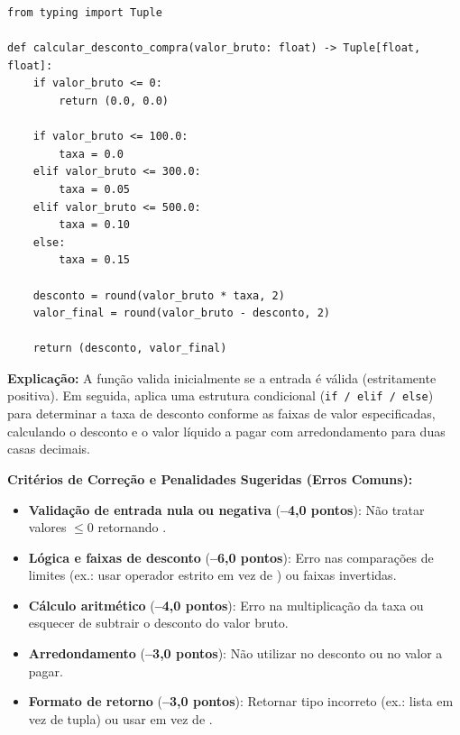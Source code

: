 \ifmostrarGabarito
\begin{verbatim}
from typing import Tuple

def calcular_desconto_compra(valor_bruto: float) -> Tuple[float, float]:
    if valor_bruto <= 0:
        return (0.0, 0.0)
    
    if valor_bruto <= 100.0:
        taxa = 0.0
    elif valor_bruto <= 300.0:
        taxa = 0.05
    elif valor_bruto <= 500.0:
        taxa = 0.10
    else:
        taxa = 0.15
        
    desconto = round(valor_bruto * taxa, 2)
    valor_final = round(valor_bruto - desconto, 2)
    
    return (desconto, valor_final)
\end{verbatim}

\textbf{Explicação:}
A função valida inicialmente se a entrada é válida (estritamente positiva). Em seguida, aplica uma estrutura condicional (\texttt{if / elif / else}) para determinar a taxa de desconto conforme as faixas de valor especificadas, calculando o desconto e o valor líquido a pagar com arredondamento para duas casas decimais.

\vspace{0.3cm}
\textbf{Critérios de Correção e Penalidades Sugeridas (Erros Comuns):}
\begin{itemize}[leftmargin=*, noitemsep, topsep=2pt]
    \item \textbf{Validação de entrada nula ou negativa} (\textbf{--4,0 pontos}): Não tratar valores $\le 0$ retornando .
    \item \textbf{Lógica e faixas de desconto} (\textbf{--6,0 pontos}): Erro nas comparações de limites (ex.: usar operador estrito \code{<} em vez de \code{<=}) ou faixas invertidas.
    \item \textbf{Cálculo aritmético} (\textbf{--4,0 pontos}): Erro na multiplicação da taxa ou esquecer de subtrair o desconto do valor bruto.
    \item \textbf{Arredondamento} (\textbf{--3,0 pontos}): Não utilizar  no desconto ou no valor a pagar.
    \item \textbf{Formato de retorno} (\textbf{--3,0 pontos}): Retornar tipo incorreto (ex.: lista em vez de tupla) ou usar  em vez de .
\end{itemize}
\else
{}
\clearpage
{}
\clearpage
\fi
